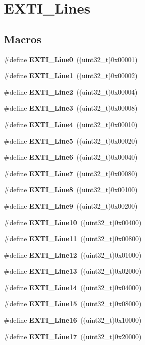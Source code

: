 \section{E\+X\+T\+I\+\_\+\+Lines}
\label{group__EXTI__Lines}
\subsection*{Macros}
\begin{DoxyCompactItemize}
\item 
\#define \textbf{ E\+X\+T\+I\+\_\+\+Line0}~((uint32\+\_\+t)0x00001)
\item 
\#define \textbf{ E\+X\+T\+I\+\_\+\+Line1}~((uint32\+\_\+t)0x00002)
\item 
\#define \textbf{ E\+X\+T\+I\+\_\+\+Line2}~((uint32\+\_\+t)0x00004)
\item 
\#define \textbf{ E\+X\+T\+I\+\_\+\+Line3}~((uint32\+\_\+t)0x00008)
\item 
\#define \textbf{ E\+X\+T\+I\+\_\+\+Line4}~((uint32\+\_\+t)0x00010)
\item 
\#define \textbf{ E\+X\+T\+I\+\_\+\+Line5}~((uint32\+\_\+t)0x00020)
\item 
\#define \textbf{ E\+X\+T\+I\+\_\+\+Line6}~((uint32\+\_\+t)0x00040)
\item 
\#define \textbf{ E\+X\+T\+I\+\_\+\+Line7}~((uint32\+\_\+t)0x00080)
\item 
\#define \textbf{ E\+X\+T\+I\+\_\+\+Line8}~((uint32\+\_\+t)0x00100)
\item 
\#define \textbf{ E\+X\+T\+I\+\_\+\+Line9}~((uint32\+\_\+t)0x00200)
\item 
\#define \textbf{ E\+X\+T\+I\+\_\+\+Line10}~((uint32\+\_\+t)0x00400)
\item 
\#define \textbf{ E\+X\+T\+I\+\_\+\+Line11}~((uint32\+\_\+t)0x00800)
\item 
\#define \textbf{ E\+X\+T\+I\+\_\+\+Line12}~((uint32\+\_\+t)0x01000)
\item 
\#define \textbf{ E\+X\+T\+I\+\_\+\+Line13}~((uint32\+\_\+t)0x02000)
\item 
\#define \textbf{ E\+X\+T\+I\+\_\+\+Line14}~((uint32\+\_\+t)0x04000)
\item 
\#define \textbf{ E\+X\+T\+I\+\_\+\+Line15}~((uint32\+\_\+t)0x08000)
\item 
\#define \textbf{ E\+X\+T\+I\+\_\+\+Line16}~((uint32\+\_\+t)0x10000)
\item 
\#define \textbf{ E\+X\+T\+I\+\_\+\+Line17}~((uint32\+\_\+t)0x20000)

\end{DoxyCompactItemize}
